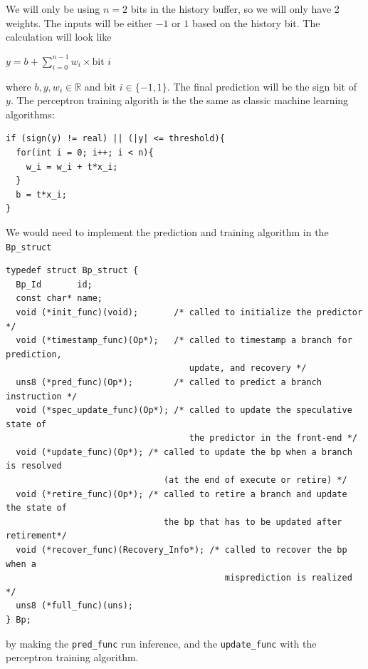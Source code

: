 \documentclass{article}
\begin{document}
\indent We will only be using $n = 2$ bits in the history buffer, so we will only have 2 weights. The inputs will be either $-1$ or $1$ based on the history bit. The calculation will look like
\begin{center}
  $y = b + \sum_{i = 0}^{n-1}w_{i} \times \text{bit } i$
\end{center}
where $b, y, w_i \in \mathbb{R}$ and $\text{bit } i \in \{-1, 1 \}$. The final prediction will be the sign bit of $y$. The perceptron training algorith is the the same as classic machine learning algorithms:
\begin{verbatim}
if (sign(y) != real) || (|y| <= threshold){
  for(int i = 0; i++; i < n){
    w_i = w_i + t*x_i;
  }
  b = t*x_i;
}
\end{verbatim}
\indent We would need to implement the prediction and training algorithm in the \verb=Bp_struct=
\begin{verbatim}
typedef struct Bp_struct {
  Bp_Id       id;
  const char* name;
  void (*init_func)(void);       /* called to initialize the predictor */
  void (*timestamp_func)(Op*);   /* called to timestamp a branch for prediction,
                                    update, and recovery */
  uns8 (*pred_func)(Op*);        /* called to predict a branch instruction */
  void (*spec_update_func)(Op*); /* called to update the speculative state of
                                    the predictor in the front-end */
  void (*update_func)(Op*); /* called to update the bp when a branch is resolved
                               (at the end of execute or retire) */
  void (*retire_func)(Op*); /* called to retire a branch and update the state of
                               the bp that has to be updated after retirement*/
  void (*recover_func)(Recovery_Info*); /* called to recover the bp when a
                                           misprediction is realized */
  uns8 (*full_func)(uns);
} Bp;
\end{verbatim}
by making the \verb=pred_func= run inference, and the \verb=update_func= with the perceptron training algorithm.


\end{document}
